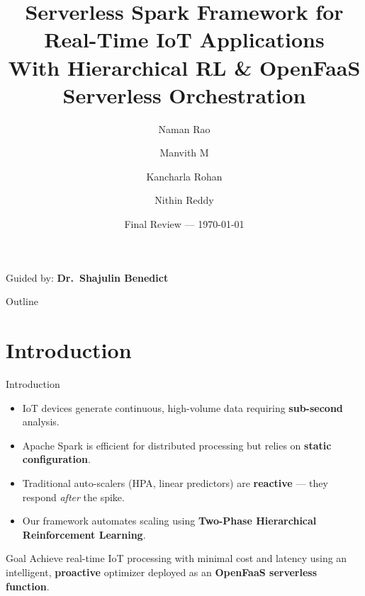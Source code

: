 \documentclass{beamer}
\title[Serverless Spark IoT Framework]{\textbf{Serverless Spark Framework for Real-Time IoT Applications}\\[6pt]
\small{With Hierarchical RL \& OpenFaaS Serverless Orchestration}}
\author{Naman Rao \and Manvith M \and Kancharla Rohan \and Nithin Reddy}
\institute{Indian Institute of Information Technology, Kottayam}
\date{Final Review --- \today}
\begin{document}
\begin{frame}
\titlepage
\begin{center}
\small{Guided by: \textbf{Dr.\ Shajulin Benedict}}
\end{center}
\end{frame}

\begin{frame}{Outline}
\tableofcontents
\end{frame}

\section{Introduction}

\begin{frame}{Introduction}
\begin{itemize}
    \item IoT devices generate continuous, high-volume data requiring \textbf{sub-second} analysis.
    \item Apache Spark is efficient for distributed processing but relies on \textbf{static configuration}.
    \item Traditional auto-scalers (HPA, linear predictors) are \textbf{reactive} --- they respond \textit{after} the spike.
    \item Our framework automates scaling using \textbf{Two-Phase Hierarchical Reinforcement Learning}.
\end{itemize}
\vspace{0.3cm}
\begin{block}{Goal}
Achieve real-time IoT processing with minimal cost and latency using an intelligent, \textbf{proactive} optimizer deployed as an \textbf{OpenFaaS serverless function}.
\end{block}
\end{frame}
\end{document}
